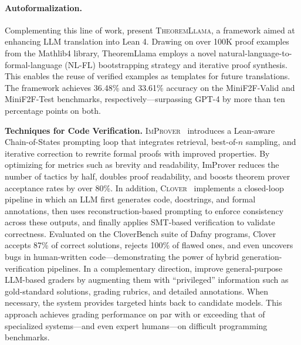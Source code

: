 \documentclass{article}
\begin{document}
\paragraph{Autoformalization.} Complementing this line of work, \citet{wang2024theoremLlama} present \textsc{TheoremLlama}, a framework aimed at enhancing LLM translation into Lean 4. Drawing on over 100K proof examples from the Mathlib4 library, TheoremLlama employs a novel natural-language-to-formal-language (NL-FL) bootstrapping strategy and iterative proof synthesis. This enables the reuse of verified examples as templates for future translations. The framework achieves 36.48\% and 33.61\% accuracy on the MiniF2F-Valid and MiniF2F-Test benchmarks, respectively—surpassing GPT-4 by more than ten percentage points on both.

\textbf{Techniques for Code Verification.}
\textsc{ImProver}~\citep{ahuja2024improver} introduces a Lean-aware Chain-of-States prompting loop that integrates retrieval, best-of-$n$ sampling, and iterative correction to rewrite formal proofs with improved properties. By optimizing for metrics such as brevity and readability, ImProver reduces the number of tactics by half, doubles proof readability, and boosts theorem prover acceptance rates by over 80\%.
In addition, \textsc{Clover}~\citep{sun2024clover} implements a closed-loop pipeline in which an LLM first generates code, docstrings, and formal annotations, then uses reconstruction-based prompting to enforce consistency across these outputs, and finally applies SMT-based verification to validate correctness. Evaluated on the CloverBench suite of Dafny programs, Clover accepts 87\% of correct solutions, rejects 100\% of flawed ones, and even uncovers bugs in human-written code—demonstrating the power of hybrid generation-verification pipelines.
In a complementary direction, \citet{zhou2025graders} improve general-purpose LLM-based graders by augmenting them with “privileged” information such as gold-standard solutions, grading rubrics, and detailed annotations. When necessary, the system provides targeted hints back to candidate models. This approach achieves grading performance on par with or exceeding that of specialized systems—and even expert humans—on difficult programming benchmarks.
\end{document}
